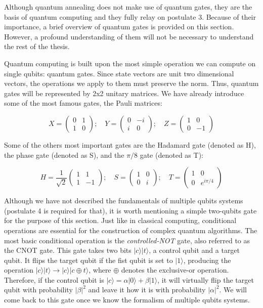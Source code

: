 Although quantum annealing does not make use of quantum gates, they are the basis of quantum computing and they fully relay on postulate 3. Because of their importance, a brief overview of quantum gates is provided on this section. However, a profound understanding of them will not be necessary to understand the rest of the thesis.

Quantum computing is built upon the most simple operation we can compute on single qubits: quantum gates. Since state vectors are unit two dimensional vectors, the operations we apply to them must preserve the norm. Thus, quantum gates will be represented by 2x2 unitary matrices. We have already introduce some of the most famous gates, the Pauli matrices:

$$ X =
\begin{pmatrix}
	0 & 1 \\
	1 & 0 
\end{pmatrix}; \quad
Y =
\begin{pmatrix}
	0 & -i \\
	i & 0 
\end{pmatrix}; \quad
Z =
\begin{pmatrix}
	1 & 0 \\
	0 & -1 
\end{pmatrix}
$$

Some of the others most important gates are the Hadamard gate (denoted as H), the phase gate (denoted as S), and the $\pi/8$ gate (denoted as T):

$$ H = \frac{1}{\sqrt 2}
\begin{pmatrix}
	1 & 1 \\
	1 & -1 
\end{pmatrix}; \quad
S =
\begin{pmatrix}
	1 & 0 \\
	0 & i 
\end{pmatrix}; \quad
T =
\begin{pmatrix}
	1 & 0 \\
	0 & e^{i\pi/4} 
\end{pmatrix}
$$

Although we have not described the fundamentals of multiple qubits systems (postulate 4 is required for that), it is worth mentioning a simple two-qubits gate for the purpose of this section. Just like in classical computing, conditional operations are essential for the construction of complex quantum algorithms. The most basic conditional operation is the \emph{controlled-NOT} gate, also referred to as the CNOT gate. This gate takes two bits $|c\rangle|t\rangle$, a control qubit and a target qubit. It flips the target qubit if the fist qubit is set to $|1\rangle$, producing the operation $|c\rangle|t\rangle \rightarrow |c\rangle|c \oplus t\rangle$, where $\oplus$ denotes the exclusive-or operation. Therefore, if the control qubit is $|c\rangle = \alpha|0\rangle + \beta|1\rangle$, it will virtually flip the target qubit with probability $|\beta|^2$ and leave it how it is with probability $|\alpha|^2$. We will come back to this gate once we know the formalism of multiple qubits systems.

